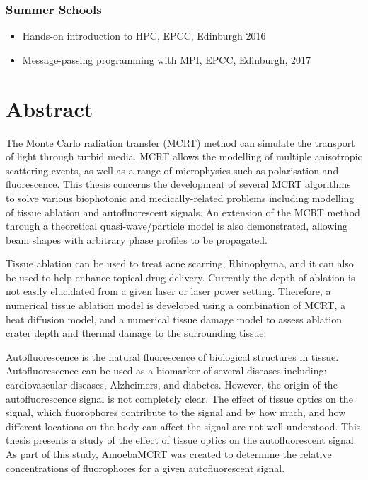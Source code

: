 \documentclass[10pt,a4paper,twoside]{book}
\begin{document}
\subsection*{Summer Schools}

\begin{itemize}
\item Hands-on introduction to HPC, EPCC, Edinburgh 2016
\item Message-passing programming with MPI, EPCC, Edinburgh, 2017
\end{itemize}

\chapter{Abstract}
The Monte Carlo radiation transfer (MCRT) method can simulate the transport of light through turbid media.
MCRT allows the modelling of multiple anisotropic scattering events, as well as a range of microphysics such as polarisation and fluorescence.
This thesis concerns the development of several MCRT algorithms to solve various biophotonic and medically-related problems including modelling of tissue ablation and autofluorescent signals.
An extension of the MCRT method through a theoretical quasi-wave/particle model is also demonstrated, allowing beam shapes with arbitrary phase profiles to be propagated.

Tissue ablation can be used to treat acne scarring, Rhinophyma, and it can also be used to help enhance topical drug delivery.
Currently the depth of ablation is not easily elucidated from a given laser or laser power setting.
Therefore, a numerical tissue ablation model is developed using a combination of MCRT, a heat diffusion model, and a numerical tissue damage model to assess ablation crater depth and thermal damage to the surrounding tissue.

Autofluorescence is the natural fluorescence of biological structures in tissue.
Autofluorescence can be used as a biomarker of several diseases including: cardiovascular diseases, Alzheimers, and diabetes.
However, the origin of the autofluorescence signal is not completely clear.
The effect of tissue optics on the signal, which fluorophores contribute to the signal and by how much, and how different locations on the body can affect the signal are not well understood.
This thesis presents a study of the effect of tissue optics on the autofluorescent signal.
As part of this study, AmoebaMCRT was created to determine the relative concentrations of fluorophores for a given autofluorescent signal.
\end{document}
